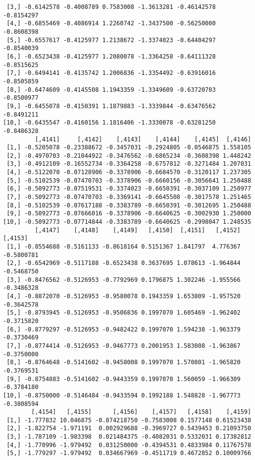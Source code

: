 \documentclass[
  letterpaper,
  DIV=11,
  numbers=noendperiod]{scrreprt}
\begin{document}
\begin{verbatim}
 [3,] -0.6142578 -0.4008789 0.7583008 -1.3613281 -0.46142578 -0.8154297
 [4,] -0.6855469 -0.4086914 1.2260742 -1.3437500 -0.56250000 -0.8608398
 [5,] -0.6557617 -0.4125977 1.2138672 -1.3374023 -0.64404297 -0.8540039
 [6,] -0.6523438 -0.4125977 1.2080078 -1.3364258 -0.64111328 -0.8515625
 [7,] -0.6494141 -0.4135742 1.2006836 -1.3354492 -0.63916016 -0.8505859
 [8,] -0.6474609 -0.4145508 1.1943359 -1.3349609 -0.63720703 -0.8500977
 [9,] -0.6455078 -0.4150391 1.1879883 -1.3339844 -0.63476562 -0.8491211
[10,] -0.6435547 -0.4160156 1.1816406 -1.3330078 -0.63281250 -0.8486328
         [,4141]     [,4142]    [,4143]    [,4144]    [,4145]  [,4146]
 [1,] -0.5205078 -0.23388672 -0.3457031 -0.2924805 -0.0546875 1.558105
 [2,] -0.4970703 -0.21044922 -0.3476562 -0.6865234 -0.3608398 1.448242
 [3,] -0.4912109 -0.16552734 -0.3364258 -0.6757812 -0.3271484 1.207031
 [4,] -0.5122070 -0.07128906 -0.3378906 -0.6684570 -0.3120117 1.237305
 [5,] -0.5102539 -0.07470703 -0.3378906 -0.6660156 -0.3056641 1.250488
 [6,] -0.5092773 -0.07519531 -0.3374023 -0.6650391 -0.3037109 1.250977
 [7,] -0.5092773 -0.07470703 -0.3369141 -0.6645508 -0.3017578 1.251465
 [8,] -0.5102539 -0.07617188 -0.3383789 -0.6650391 -0.3012695 1.250488
 [9,] -0.5092773 -0.07666016 -0.3378906 -0.6640625 -0.3002930 1.250000
[10,] -0.5092773 -0.07714844 -0.3383789 -0.6640625 -0.2998047 1.248535
         [,4147]    [,4148]    [,4149]   [,4150]  [,4151]   [,4152]    [,4153]
 [1,] -0.8554688 -0.5161133 -0.8618164 0.5151367 1.841797  4.776367 -0.5800781
 [2,] -0.6542969 -0.5117188 -0.6523438 0.3637695 1.078613 -1.964844 -0.5468750
 [3,] -0.8476562 -0.5126953 -0.7792969 0.1796875 1.302246 -1.955566 -0.3486328
 [4,] -0.8872070 -0.5126953 -0.9580078 0.1943359 1.653809 -1.957520 -0.3642578
 [5,] -0.8793945 -0.5126953 -0.9506836 0.1997070 1.605469 -1.962402 -0.3715820
 [6,] -0.8779297 -0.5126953 -0.9482422 0.1997070 1.594238 -1.963379 -0.3730469
 [7,] -0.8774414 -0.5126953 -0.9467773 0.2001953 1.583008 -1.963867 -0.3750000
 [8,] -0.8764648 -0.5141602 -0.9458008 0.1997070 1.570801 -1.965820 -0.3769531
 [9,] -0.8754883 -0.5141602 -0.9443359 0.1997070 1.560059 -1.966309 -0.3784180
[10,] -0.8750000 -0.5146484 -0.9433594 0.1992188 1.548828 -1.967773 -0.3808594
        [,4154]   [,4155]      [,4156]    [,4157]   [,4158]    [,4159]
 [1,] -1.777832 10.046875 -0.074218750 -0.7583008 0.1577148 0.61523438
 [2,] -1.822754 -1.971191  0.002929688 -0.3969727 0.5439453 0.21093750
 [3,] -1.787109 -1.983398  0.021484375 -0.4082031 0.5332031 0.17382812
 [4,] -1.770996 -1.979492  0.031250000 -0.4394531 0.4833984 0.11767578
 [5,] -1.779297 -1.979492  0.034667969 -0.4511719 0.4672852 0.10009766

\end{verbatim}
\end{document}
